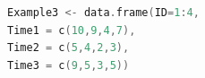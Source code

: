 \begin{lstlisting}[language=c++,label={code:23_13},caption={Converting to data frame}]
Example3 <- data.frame(ID=1:4,
Time1 = c(10,9,4,7),
Time2 = c(5,4,2,3),
Time3 = c(9,5,3,5))
\end{lstlisting}
